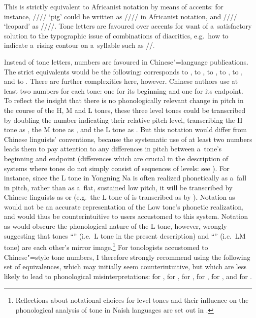 {{{{{This is strictly equivalent to Africanist notation by means of accents: for instance, //// ‘pig’
could be written as //// in Africanist notation, and //// ‘leopard’ as ////. Tone letters are favoured over accents for want
of a~satisfactory solution to the typographic issue of combinations of diacritics, e.g.~how to
indicate a~rising contour on a~syllable such as //.

Instead of tone letters, numbers are favoured in {Chinese}"=language publications. The strict equivalents would be the following:  corresponds to ,  to ,  to ,  to ,  to , and  to
. There are further complexities here, however. {Chinese} authors use at least two numbers for each tone: one for its beginning and one for its endpoint. To reflect the insight that there is no phonologically relevant change in pitch in the course of the H, M and L tones, these three level tones could be transcribed by doubling the number indicating their relative pitch level, transcribing the H tone as , the M tone as , and the L tone as . But this notation would differ from {Chinese} linguists' conventions, because the systematic use of at least two numbers leads them to pay attention to any differences in pitch between a~tone's beginning and endpoint (differences which are crucial in the description of systems where tones do not simply consist of sequences of levels: see ). For instance, since the L tone in Yongning Na is often realized phonetically as a~fall in pitch, rather than as a~flat, sustained low pitch, it will be transcribed by {Chinese} linguists as  or  (e.g.~the L tone of  is transcribed as  by \citealt{heetal1985}). Notation as  would not be an accurate representation of the Low tone's phonetic realization, and would thus be counterintuitive to users accustomed to this system. Notation as  would obscure the phonological nature of the L tone, however, wrongly suggesting that tones “” (i.e.\ L tone in the present description) and “” (i.e.\ LM tone) are each other's mirror image.\footnote{Reflections about notational choices for level tones and their influence on the phonological analysis of tone in {Naish} languages are set out in \citet{michaud2013c}.} For tonologists accustomed to {Chinese}"=style tone numbers, I therefore strongly recommend using the following set of equivalences, which may initially seem counterintuitive, but which are less likely to lead to phonological misinterpretations:  for ,  for ,  for ,  for ,  for , and  for . 

}}}}}

